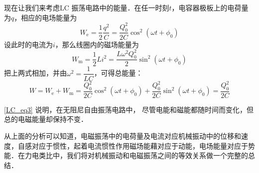 现在让我们来考虑LC 振荡电路中的能量．在任一时刻$t$，电容器极板上的电荷量为$q$，相应的电场能量为
\begin{equation}
W_{\mathrm e}=\frac{1}{2} \frac{q^{2}}{C}=\frac{Q_{0}^{2}}{2 C} \cos ^{2}\left(\omega t+\phi_{0}\right)
\end{equation}
设此时的电流为$i$，那么线圈内的磁场能量为
\begin{equation}
W_{\mathrm{m}}=\frac{1}{2} L i^{2}=\frac{L \omega^{2} Q_{0}^{2}}{2} \sin ^{2}\left(\omega t+\phi_{0}\right)
\end{equation}
把上两式相加，并由$\omega^{2}=\dfrac{1}{L C}$，可得总能量：
\begin{equation} \label{LC_eq3}
W=W_{\mathrm{e}}+W_{\mathrm{m}}=\frac{Q_{0}^{2}}{2 C} \cos ^{2}\left(\omega t+\phi_{0}\right)+\frac{Q_{0}^{2}}{2 C} \sin ^{2}\left(\omega t+\phi_{0}\right)=\frac{Q_{0}^{2}}{2 C}
\end{equation}

\autoref{LC_eq3} 说明，在无阻尼自由振荡电路中， 尽管电能和磁能都随时间而变化，但总的电磁能量却保持不变．

从上面的分析可以知道，电磁振荡中的电荷量及电流对应机械振动中的位移和速度，自感对应于惯性，起着电流惯性作用磁场能藉对应于动能，电场能量对应于势能．在力电类比中，我们将对机械振动和电磁振荡之间的等效关系做一个完整的总结．

 
